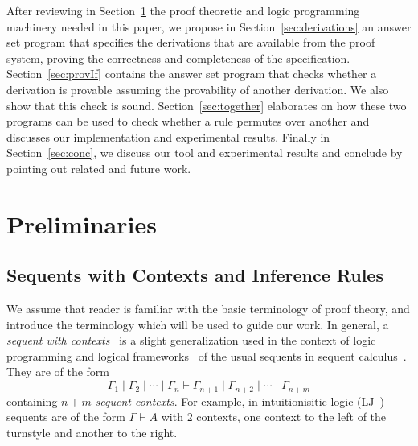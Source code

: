 \documentclass{new_tlp}
\begin{document}
After reviewing  in Section~\ref{sec:prelim} the proof theoretic and logic programming machinery needed in 
this paper, we propose in Section~\ref{sec:derivations} an answer set program that specifies the derivations
that are available from the proof system, proving the correctness and completeness of the specification. 
Section~\ref{sec:provIf} contains the answer set program that checks whether a derivation is provable
assuming the provability of another derivation. We also show that this check is sound. Section~\ref{sec:together} elaborates
on how these two programs can be used to check whether a rule permutes over another and discusses our implementation 
and experimental results. Finally in Section~\ref{sec:conc}, we discuss our tool and experimental results 
and conclude by pointing out related and future work.

\vspace{-2mm}

\section{Preliminaries}
\label{sec:prelim}

\subsection{Sequents with Contexts and Inference Rules}
\label{sec:sequents}
We assume that reader is familiar with the basic terminology of proof theory, and 
introduce the terminology which will be used to guide our work.
In general, a \emph{sequent with contexts}~\cite{andreoli92jlc} is a slight generalization used in the context of 
logic programming and logical frameworks~\cite{nigam10jar,cervesato02ic} of the usual sequents in 
sequent calculus~\cite{gentzen35}. They are of the form
\[
\Gamma_1 \mid \Gamma_2 \mid \cdots \mid \Gamma_n \vdash
\Gamma_{n + 1} \mid \Gamma_{n + 2} \mid \cdots \mid \Gamma_{n + m}
\]
containing $n + m$ \emph{sequent contexts}. 
For example, in intuitionisitic logic (LJ~\cite{gentzen35}) sequents are of the form 
$\Gamma \vdash A$ with $2$ contexts, one context to the left of the turnstyle and another
to the right.
\end{document}
